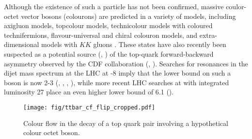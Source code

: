 Although the existence of such a particle has not been confirmed, massive coulor-octet vector bosons (colourons) are predicted in a variety of models, including axigluon models, topcolour models, technicolour models with coloured technifermions, flavour-universal and chiral colouron models, and extra-dimensional models with $KK$ gluons \cite{Chivukula:2013xla}.  These states have also recently been suspected as a potential source (\cite{Ferrario:2009bz}, \cite{Frampton:2009rk}) of the top-quark forward-backward asymmetry observed by the CDF collaboration (\cite{Aaltonen:2008hc}, \cite{Aaltonen:2011kc}). Searches for resonances in the dijet mass spectrum at the LHC at -8 \TeV imply that the lower bound on such a boson is now 2-3 \TeV (\cite{Han:2010rf}, \cite{Haisch:2011up}, \cite{Chatrchyan:2011ns}, \cite{Aad:2011fq}), while more recent LHC searches at  \TeV with integrated luminosity 27 \fbinv place an even higher lower bound of 6.1 \TeV (\cite{CMS:2017xrr}).
  
  \begin{figure}[h!]
  \centering
  \texttt{[image: fig/ttbar\_cf\_flip\_cropped.pdf]}
  \caption{Colour flow in the decay of a top quark pair involving a hypothetical colour octet \PW boson.}
  \label{fig:ttbar_cf_octet}
\end{figure}

